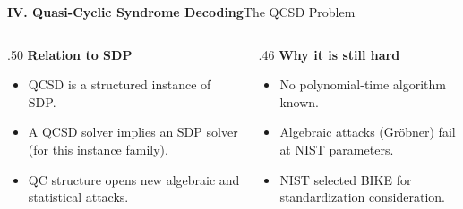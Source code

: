 \begin{frame}[shrink=5]{\textbf{IV. Quasi-Cyclic Syndrome Decoding}}{The QCSD Problem}
\begin{columns}[T,onlytextwidth]
\begin{column}{.50\textwidth}
\textcolor{TealDarkCyan}{\textbf{Relation to SDP}}
\begin{itemize}
  \item QCSD is a structured instance of SDP.
  \item A QCSD solver implies an SDP solver (for this instance family).
  \item QC structure opens new algebraic and statistical attacks.
\end{itemize}
\end{column}
\begin{column}{.46\textwidth}
\textcolor{TealDarkCyan}{\textbf{Why it is still hard}}
\begin{itemize}
  \item No polynomial-time algorithm known.
  \item Algebraic attacks (Gröbner) fail at NIST parameters.
  \item NIST selected BIKE for standardization consideration.
\end{itemize}
\end{column}
\end{columns}
\end{frame}

